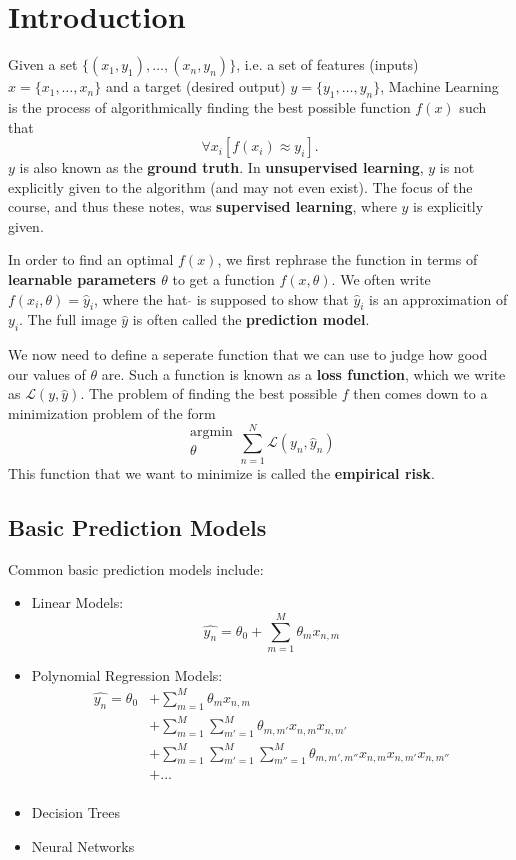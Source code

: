 \documentclass{report}
\newcommand{\tbf}{\textbf}
\newcommand{\argmin}[1] {
    \begin{array}{c}
        \text{argmin}\\
        #1\\
        \end{array}
    }
\newcommand*{\newpar}{\par\vspace{\baselineskip}\noindent}
\begin{document}

\tableofcontents
\thispagestyle{fancy}
\chapter{Introduction}
Given a set $\{(x_1,y_1), \hdots, (x_n,y_n)\}$, i.e. a set of features (inputs) $x = \{x_1, \hdots, x_n\}$ and a target (desired output) $y = \{y_1, \hdots, y_n\}$, Machine Learning is the process of algorithmically finding the best possible function $f(x)$ such that
\begin{equation*}
 \forall x_i[f(x_i) \approx y_i].
\end{equation*}
$y$ is also known as the \tbf{ground truth}.
In \tbf{unsupervised learning}, $y$ is not explicitly given to the algorithm (and may not even exist). The focus of the course, and thus these notes, was \tbf{supervised learning}, where $y$ is explicitly given.
\newpar
In order to find an optimal $f(x)$, we first rephrase the function in terms of \tbf{learnable parameters $\theta$} to get a function $f(x,\theta)$. We often write $f(x_i, \theta) = \hat{y}_i$, where the hat $\hat{}$ is supposed to show that $\hat{y}_i$ is an approximation of $y_i$. The full image $\hat{y}$ is often called the \tbf{prediction model}.
\newpar
We now need to define a seperate function that we can use to judge how good our values of $\theta$ are. Such a function is known as a \tbf{loss function}, which we write as $\mathcal{L}(y, \hat{y})$. The problem of finding the best possible $f$ then comes down to a minimization problem of the form
\begin{equation*}
\argmin{\theta} \sum_{n=1}^N \mathcal{L}(y_n, \hat{y}_n)
\end{equation*}
This function that we want to minimize is called the \tbf{empirical risk}.
\newpar
\section{Basic Prediction Models}
Common basic prediction models include:
\begin{itemize}
 \item Linear Models:
 \begin{equation*}
 \hat{y_n} = \theta_0 + \sum_{m=1}^M \theta_m x_{n,m} 
 \end{equation*}
 \item Polynomial Regression Models:
 \begin{align*}
 \hat{y_n} = \theta_0 &+ \sum_{m=1}^M \theta_m x_{n,m}\\
           &+ \sum_{m=1}^M \sum_{m'=1}^M \theta_{m,m'} x_{n,m} x_{n,m'}\\
           &+ \sum_{m=1}^M \sum_{m'=1}^M \sum_{m''=1}^M \theta_{m,m',m''} x_{n,m} x_{n,m'} x_{n,m''}\\
           &+ \hdots\\
 \end{align*}
 \item Decision Trees
 \item Neural Networks
\end{itemize}
%
\end{document}
